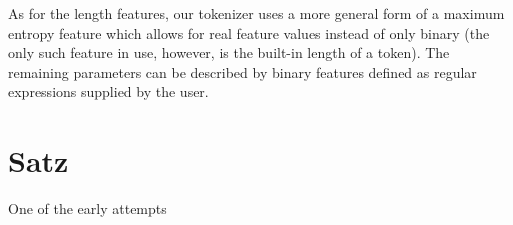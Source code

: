As for the length features, our tokenizer uses a more general form of a maximum
entropy feature which allows for real feature values instead of only binary
(the only such feature in use, however, is the built-in length of a token).
The remaining parameters can be described by binary features defined as regular
expressions supplied by the user.

\section{Satz}
\label{sec:survey-satz}

One of the early attempts 
